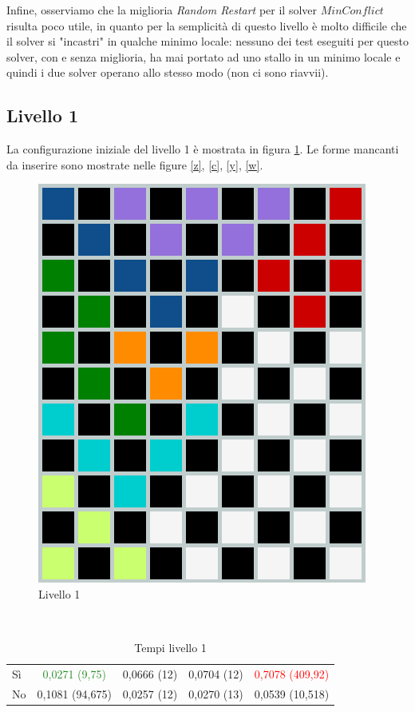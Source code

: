 Infine, osserviamo che la miglioria \textit{Random Restart} per il solver $MinConflict$ risulta poco utile, in quanto per la semplicità di questo livello è molto difficile che il solver si "incastri" in qualche minimo locale: nessuno dei test eseguiti per questo solver, con e senza miglioria, ha mai portato ad uno stallo in un minimo locale e quindi i due solver operano allo stesso modo (non ci sono riavvii).
\newpage
\subsection{Livello 1}
La configurazione iniziale del livello 1 è mostrata in figura \ref{lev1}. Le forme mancanti da inserire sono mostrate nelle figure \ref{z}, \ref{c}, \ref{y}, \ref{w}.
\begin{figure}[h]
	\centering
	\includegraphics[scale=0.3]{immagini/lv1}
	\caption{Livello 1}
	\label{lev1}
\end{figure}
\\
\noindent
\begin{table} [h]
	\begin{tabular}{|l||*{4}{c|}}\hline 
		\backslashbox{Miglioria}{Solver} 
		&\makebox{DFS}&\makebox{Backtracking}&\makebox{Recursive Backtracking}	&\makebox{MinConflict}\\ \hline 
		Sì&\textcolor{ForestGreen}{0,0271 (9,75)}&0,0666 (12)&0,0704 (12)&\textcolor{red}{0,7078 (409,92)} \\ \hline 
		No&0,1081 (94,675)&0,0257 (12)&0,0270 (13)&0,0539 (10,518)  \\ \hline 
	\end{tabular} 
	\caption{Tempi livello 1}
\end{table}

